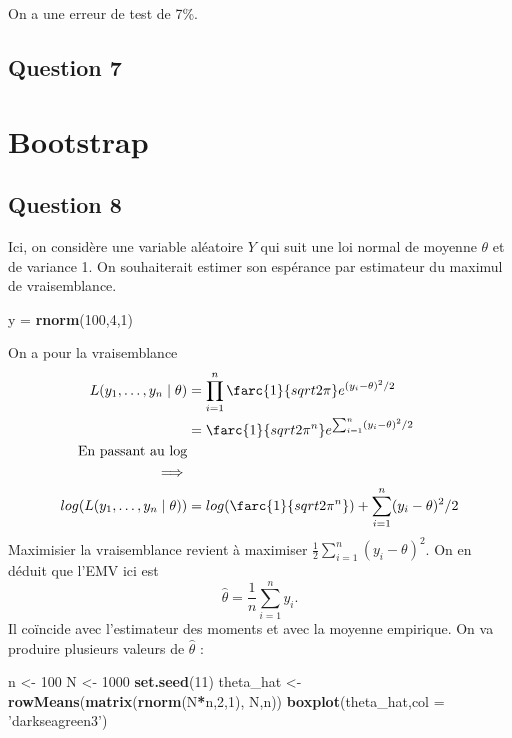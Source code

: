 \documentclass[]{article}
\newenvironment{Shaded}{\begin{snugshade}}{\end{snugshade}}
\newcommand{\DataTypeTok}[1]{\textcolor[rgb]{0.13,0.29,0.53}{#1}}
\newcommand{\DecValTok}[1]{\textcolor[rgb]{0.00,0.00,0.81}{#1}}
\newcommand{\KeywordTok}[1]{\textcolor[rgb]{0.13,0.29,0.53}{\textbf{#1}}}
\newcommand{\NormalTok}[1]{#1}
\newcommand{\OperatorTok}[1]{\textcolor[rgb]{0.81,0.36,0.00}{\textbf{#1}}}
\newcommand{\StringTok}[1]{\textcolor[rgb]{0.31,0.60,0.02}{#1}}
\begin{document}
On a une erreur de test de 7\%.

\hypertarget{question-7}{%
\subsection{Question 7}\label{question-7}}

\hypertarget{bootstrap}{%
\section{Bootstrap}\label{bootstrap}}

\hypertarget{question-8}{%
\subsection{Question 8}\label{question-8}}

Ici, on considère une variable aléatoire \(Y\) qui suit une loi normal
de moyenne \(\theta\) et de variance 1. On souhaiterait estimer son
espérance par estimateur du maximul de vraisemblance.

\begin{Shaded}
\begin{Highlighting}[]
\NormalTok{y =}\StringTok{ }\KeywordTok{rnorm}\NormalTok{(}\DecValTok{100}\NormalTok{,}\DecValTok{4}\NormalTok{,}\DecValTok{1}\NormalTok{)}
\end{Highlighting}
\end{Shaded}

On a pour la vraisemblance \begin{align*}
L(y_1,\dots,y_n\mid \theta) &= \displaystyle \prod_{i=1}^n \farc{1}{sqrt{2\pi}}e^{(y_i-\theta)^2/2}\\
&= \displaystyle \farc{1}{sqrt{2\pi}^n}e^{\sum_{i=1}^n(y_i-\theta)^2/2}\\
\mbox{En passant au log}\\
\implies\\
log(L(y_1,\dots,y_n\mid \theta)) &= \displaystyle log(\farc{1}{sqrt{2\pi}^n})  + \sum_{i=1}^n(y_i-\theta)^2/2
\end{align*} Maximisier la vraisemblance revient à maximiser
\(\displaystyle \frac{1}{2}\sum_{i=1}^n(y_i-\theta)^2\). On en déduit
que l'EMV ici est
\[\displaystyle \hat{\theta} = \frac{1}{n}\sum_{i=1}^ny_i.\] Il coïncide
avec l'estimateur des moments et avec la moyenne empirique. On va
produire plusieurs valeurs de \(\hat{\theta}\) :

\begin{Shaded}
\begin{Highlighting}[]
\NormalTok{n <-}\StringTok{ }\DecValTok{100}
\NormalTok{N <-}\StringTok{ }\DecValTok{1000}
\KeywordTok{set.seed}\NormalTok{(}\DecValTok{11}\NormalTok{)}
\NormalTok{theta_hat <-}\StringTok{ }\KeywordTok{rowMeans}\NormalTok{(}\KeywordTok{matrix}\NormalTok{(}\KeywordTok{rnorm}\NormalTok{(N}\OperatorTok{*}\NormalTok{n,}\DecValTok{2}\NormalTok{,}\DecValTok{1}\NormalTok{), N,n))}
\KeywordTok{boxplot}\NormalTok{(theta_hat,}\DataTypeTok{col =} \StringTok{'darkseagreen3'}\NormalTok{)}
\end{Highlighting}
\end{Shaded}
\end{document}
